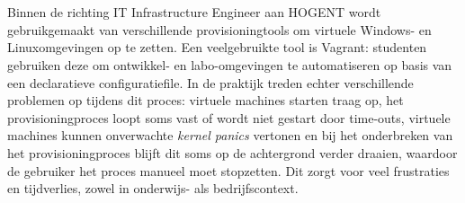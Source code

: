 
\chapter{}%
\label{ch:inleiding}

%

Binnen de richting IT Infrastructure Engineer aan HOGENT wordt gebruikgemaakt van verschillende provisioningtools om virtuele Windows- en Linuxomgevingen op te zetten. Een veelgebruikte tool is Vagrant: studenten gebruiken deze om ontwikkel- en labo-omgevingen te automatiseren op basis van een declaratieve configuratiefile. In de praktijk treden echter verschillende problemen op tijdens dit proces: virtuele machines starten traag op, het provisioningproces loopt soms vast of wordt niet gestart door time-outs, virtuele machines kunnen onverwachte \emph{kernel panics} vertonen en bij het onderbreken van het provisioningproces blijft dit soms op de achtergrond verder draaien, waardoor de gebruiker het proces manueel moet stopzetten. Dit zorgt voor veel frustraties en tijdverlies, zowel in onderwijs- als bedrijfscontext.



\section{}%
\label{sec:probleemstelling}

